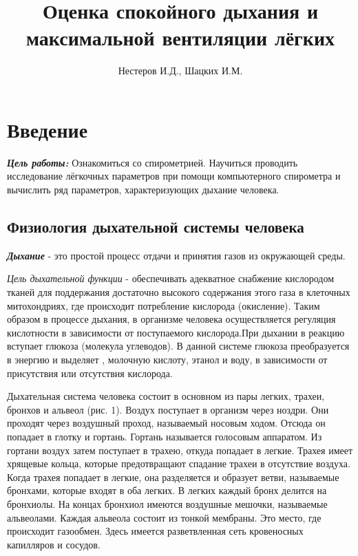 \documentclass{article}
\title{Оценка спокойного дыхания и максимальной вентиляции лёгких}
\author{Нестеров И.Д., Шацких И.М.}
\date{}
\begin{document}
    \maketitle
    \tableofcontents
    \newpage

    \section*{Введение}

        \hspace*{4mm}\textbf{\textit{Цель работы:}} Ознакомиться со спирометрией.
        Научиться проводить исследование лёгкочных параметров при помощи компьютерного спирометра и
        вычислить ряд параметров, характеризующих дыхание человека.

        \subsection*{Физиология дыхательной системы человека}

            \hspace*{4mm}\textbf{\textit{Дыхание}} - это простой процесс отдачи и принятия газов из окружающей
            среды.
            \vspace*{4mm}

            \textit{Цель дыхательной функции} - обеспечивать адекватное снабжение
            кислородом тканей для поддержания достаточно высокого содержания этого газа
            в клеточных митохондриях, где происходит потребление кислорода (окисление).
            Таким образом в процессе дыхания, в организме человека осуществляется
            регуляция кислотности в зависимости от поступаемого кислорода.При дыхании
            в реакцию вступает глюкоза (молекула углеводов). В данной системе глюкоза
            преобразуется в энергию и выделяет , молочную кислоту, этанол и воду, в
            зависимости от присутствия или отсутствия кислорода.
            \vspace*{4mm}

            Дыхательная система человека состоит в основном из пары легких, трахеи,
            бронхов и альвеол (рис. 1). Воздух поступает в организм через ноздри. Они
            проходят через воздушный проход, называемый носовым ходом. Отсюда он
            попадает в глотку и гортань. Гортань называется голосовым аппаратом. Из
            гортани воздух затем поступает в трахею, откуда попадает в легкие. Трахея имеет
            хрящевые кольца, которые предотвращают спадание трахеи в отсутствие воздуха.
            Когда трахея попадает в легкие, она разделяется и образует ветви, называемые
            бронхами, которые входят в оба легких. В легких каждый бронх делится на
            бронхиолы. На концах бронхиол имеются воздушные мешочки, называемые
            альвеолами. Каждая альвеола состоит из тонкой мембраны. Это место, где
            происходит газообмен. Здесь имеется разветвленная сеть кровеносных
            капилляров и сосудов.
            \vspace*{4mm}
\end{document}
